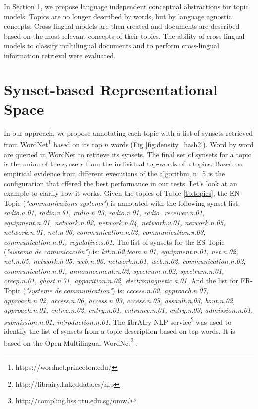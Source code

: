 In Section \ref{sec:synset-space}, we propose language independent conceptual abstractions for topic models. Topics are no longer described by words, but by language agnostic concepts. Cross-lingual models are then created and documents are described based on the most relevant concepts of their topics. The ability of cross-lingual models to classify multilingual documents and to perform cross-lingual information retrieval were evaluated.

\section{Synset-based Representational Space}
\label{sec:synset-space}

In our approach, we propose annotating each topic with a list of synsets \citep{Bond2013} retrieved from WordNet\footnote{https://wordnet.princeton.edu/}\citep{Miller1995WordNet:English} based on its top $n$ words (Fig \ref{fig:density_hash2}). Word by word are queried in WordNet to retrieve its synsets. The final set of synsets for a topic is the union of the synsets from the individual top-words of a topics. Based on empirical evidence from different executions of the algorithm, n=5 is the configuration that offered the best performance in our tests. Let's look at an example to clarify how it works. Given the topics of Table \ref{tb:topics}, the EN-Topic (\textit{"communications systems"}) is annotated with the following synset list: \textit{radio.a.01, radio.v.01, radio.n.03, radio.n.01, radio\_receiver.n.01, equipment.n.01, network.n.02, network.n.04, network.v.01, network.n.05, network.n.01, net.n.06, communication.n.02, communication.n.03, communication.n.01, regulative.s.01}. The list of synsets for the ES-Topic (\textit{"sistema de comunicaci\'on"}) is:  \textit{kit.n.02,team.n.01, equipment.n.01, net.n.02, net.n.05, network.n.05, web.n.06, network.n.01, web.n.02, communication.n.02, communication.n.01, announcement.n.02, spectrum.n.02, spectrum.n.01, creep.n.01, ghost.n.01, apparition.n.02, electromagnetic.a.01}. And the list for FR-Topic (\textit{"systeme de communication"}) is:  \textit{access.n.02, approach.n.07, approach.n.02, access.n.06, access.n.03, access.n.05, assault.n.03, bout.n.02, approach.n.01, entree.n.02, entry.n.01, entrance.n.01, entry.n.03, admission.n.01, submission.n.01, introduction.n.01}. The librAIry NLP service\footnote{http://librairy.linkeddata.es/nlp} was used to identify the list of synsets from a topic description based on top words. It is based on the Open Multilingual WordNet\footnote{http://compling.hss.ntu.edu.sg/omw/} \citep{Bond2012}.

